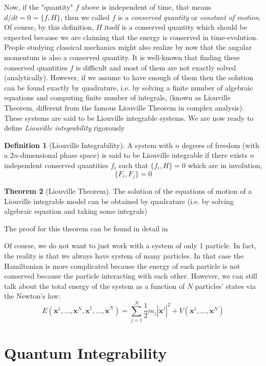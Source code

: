 \documentclass[]{article}
\theoremstyle{definition}
\newtheorem{theorem}{Theorem}[section]
\newtheorem{definition}[theorem]{Definition}
\begin{document}
	Now, if the "quantity" $f$ above is independent of time, that means $d/dt=0=\{f,H\}$, then we called $f$ is a \emph{conserved quantity} or \emph{constant of motion}. Of course, by this definition, $H$ itself is a conserved quantity which should be expected because we are claiming that the energy is conserved in time-evolution. People studying classical mechanics might also realize by now that the angular momentum is also a conserved quantity. It is well-known that finding these conserved quantities $f$ is difficult and most of them are not exactly solved (analytically). However, if we assume to  have enough of them then the solution can be found exactly by quadrature, i.e. by solving a finite number of algebraic equations and computing finite number of integrals, (known as Liouville Theorem, different from the famous Liouville Theorem in complex analysis). These systems are said to be Liouville integrable systems. We are now ready to define \emph{Liouville integrability} rigorously
	

	\begin{definition}[Liouville Integrability]
		A system with $n$ degrees of freedom (with a $2n$-dimensional phase space) is said to be Liouville integrable if there exists $n$ independent conserved quantities $f_i$ such that $\{f_i,H\}=0$ which are in involution, 
		\begin{equation}
			\{F_i,F_j\}=0
		\end{equation}
	\end{definition}

	\begin{theorem}[Liouville Theorem]
		The solution of the equations of motion of a Liouville integrable model can be obtained by quadrature (i.e. by solving algebraic equation and taking some integrals)
	\end{theorem}

	The proof for this theorem can be found in detail in \cite{babelon_bernard_talon_2003}
	
	Of course, we do not want to just work with a system of only 1 particle. In fact, the reality is that we always have system of many particles. In that case the Hamiltonian is  more complicated because the energy of each particle is not conserved because the particle interacting with each other. However, we can still talk about the total energy of the system as a function of $N$ particles' states via the Newton's law: 
	$$E(\textbf{x}^1, \dots, \textbf{x}^N, \dot{\textbf{x}}^1, \dots, \dot{\textbf{x}}^N)
	=\sum_{j=1}^N\frac{1}{2}m_j |\dot{\textbf{x}}^j|^2 + V(\textbf{x}^1, \dots, \textbf{x}^N) $$
	 
	 
	
	\section{Quantum Integrability}
	
	
	\newpage		
	
		
	
\end{document}
